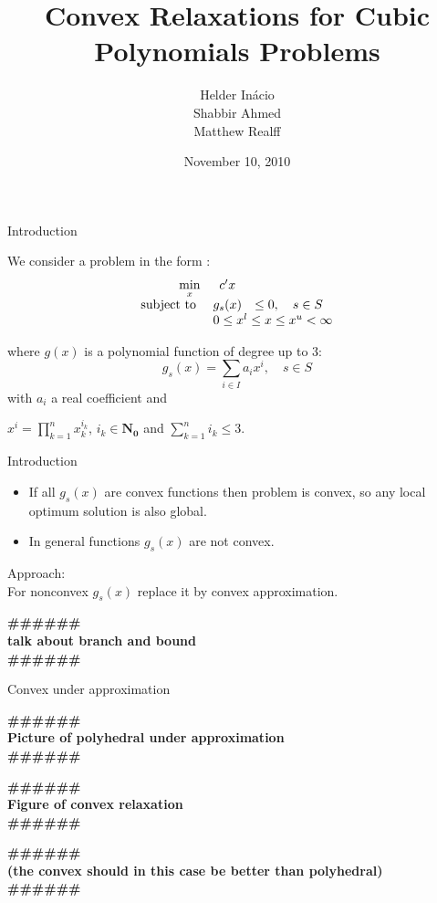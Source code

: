 \documentclass{beamer}
\title{Convex Relaxations for Cubic Polynomials Problems}
\author[In\'acio, Ahmed, Realff]{Helder In\'acio \\ Shabbir Ahmed \\ Matthew Realff}
\date{November 10, 2010}
\institute[GATech]{Georgia Institute of Technology}
\newcommand{\todo}[1]
{\begin{tiny}
  \begin{center} {\color{red}
  \textbf{ {\#\#\#\hfill\#\#\#}\\{#1}\\\#\#\#\hfill\#\#\#}}
\end{center}
\end{tiny}} %
\begin{document}
\begin{frame}
\titlepage
\end{frame}



\begin{frame}{Introduction}

  We consider a problem in the form :
  \begin{displaymath}
    \begin{array}[h]{rcl}
      \min\limits_x & c'x & \\
      \text{subject to } & g_s(x) & \leq 0 , \quad s \in S\\
      & \multicolumn{2}{l}{ 0 \leq x^l \leq x \leq x^u < \infty} \\
    \end{array}
  \end{displaymath}

where $g(x)$ is a polynomial function of degree up to 3:
\begin{displaymath}
  g_s(x) = \sum_{i \in I} a_i x^i, \quad s \in S
\end{displaymath}
with $a_i$ a real coefficient and

$x^i = \prod_{k=1}^{n} x_k^{i_k}$, $i_k \in \mathbf{N_0}$ and $\sum_{k=1}^n i_k \leq 3$.

\end{frame}

\begin{frame}{Introduction}

  \begin{itemize}
    \item
  If all $g_s(x)$ are convex functions then problem is convex,
  so any local optimum solution is also global.
  \item
    In general functions $g_s(x)$ are not convex.
  \end{itemize}

  Approach: \\
  For nonconvex $g_s(x)$ replace it by convex approximation.
  \todo{talk about branch and bound}

\end{frame}

\begin{frame}{Convex under approximation }

  \todo{ Picture of polyhedral under approximation}
  \todo{ Figure of convex relaxation }

  \todo{ (the convex should in this case be better than polyhedral)}

\end{frame}
\end{document}
